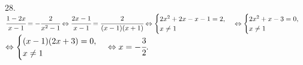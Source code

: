 28. $\cfrac{1-2x}{x-1}=-\cfrac{2}{x^2-1}\Leftrightarrow\cfrac{2x-1}{x-1}=\cfrac{2}{(x-1)(x+1)}\Leftrightarrow \begin{cases} 2x^2+2x-x-1=2,\\ x\neq1\end{cases}
\Leftrightarrow \begin{cases} 2x^2+x-3=0,\\ x\neq1\end{cases}$\\$\Leftrightarrow \begin{cases} (x-1)(2x+3)=0,\\ x\neq1\end{cases}\Leftrightarrow x=-\cfrac{3}{2}.$\\
